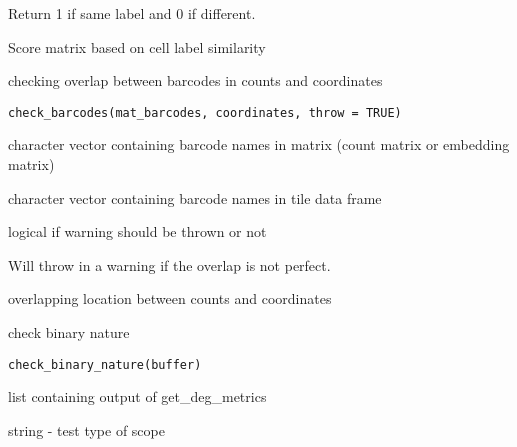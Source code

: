 \documentclass[a4paper]{book}
\begin{document}
%
\begin{Details}
Return 1 if same label and 0 if different.
\end{Details}
%
\begin{Value}
Score matrix based on cell label similarity
\end{Value}
%
\begin{Description}
checking overlap between barcodes in counts and coordinates
\end{Description}
%
\begin{Usage}
\begin{verbatim}
check_barcodes(mat_barcodes, coordinates, throw = TRUE)
\end{verbatim}
\end{Usage}
%
\begin{Arguments}
\begin{ldescription}
\item[\code{mat\_barcodes}] character vector containing barcode names in matrix
(count matrix or embedding matrix)

\item[\code{coordinates}] character vector containing barcode names in tile
data frame

\item[\code{throw}] logical if warning should be thrown or not
\end{ldescription}
\end{Arguments}
%
\begin{Details}
Will throw in a warning if the overlap is not perfect.
\end{Details}
%
\begin{Value}
overlapping location between counts and coordinates
\end{Value}
%
\begin{Description}
check binary nature
\end{Description}
%
\begin{Usage}
\begin{verbatim}
check_binary_nature(buffer)
\end{verbatim}
\end{Usage}
%
\begin{Arguments}
\begin{ldescription}
\item[\code{buffer}] list containing output of get\_deg\_metrics

\item[\code{test}] string - test type of scope
\end{ldescription}
\end{Arguments}
\end{document}
